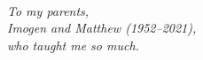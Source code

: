 \newpage
\thispagestyle{empty}
~
\vfill
\begin{center}
\itshape%
To my parents,\\
Imogen and Matthew (1952--2021),\\
who taught me so much.
\end{center}
\vfill
~
\newpage
\thispagestyle{empty}
~